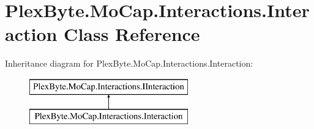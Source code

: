 \hypertarget{class_plex_byte_1_1_mo_cap_1_1_interactions_1_1_interaction}{}\section{Plex\+Byte.\+Mo\+Cap.\+Interactions.\+Interaction Class Reference}
\label{class_plex_byte_1_1_mo_cap_1_1_interactions_1_1_interaction}
Inheritance diagram for Plex\+Byte.\+Mo\+Cap.\+Interactions.\+Interaction\+:\begin{figure}[H]
\begin{center}
\leavevmode
\includegraphics[height=2.000000cm]{class_plex_byte_1_1_mo_cap_1_1_interactions_1_1_interaction}
\end{center}
\end{figure}
